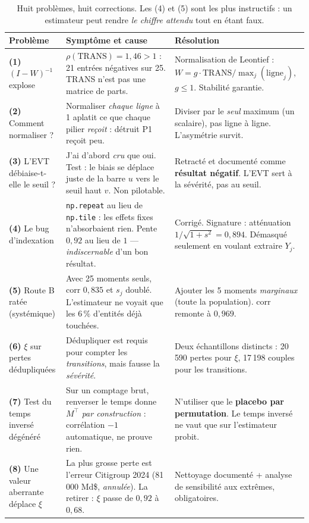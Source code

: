 \documentclass[11pt,a4paper]{article}
\newcommand{\Y}{Y}
\begin{document}
\begin{table}[htbp]\centering\small
\renewcommand{\arraystretch}{1.35}
\begin{tabularx}{\textwidth}{@{}>{\raggedright\arraybackslash}p{3.5cm} >{\raggedright\arraybackslash}X >{\raggedright\arraybackslash}p{4.4cm}@{}}
\toprule
\textbf{Problème} & \textbf{Symptôme et cause} & \textbf{Résolution} \\
\midrule
\textbf{(1)} $(I-W)^{-1}$ explose &
$\rho(\mathrm{TRANS})=1{,}46>1$ : 21 entrées négatives sur 25. TRANS n'est pas une matrice de
parts. &
Normalisation de Leontief : $W=g\cdot\mathrm{TRANS}/\max_j(\text{ligne}_j)$, $g\le 1$. Stabilité
garantie. \\
\addlinespace[2pt]
\textbf{(2)} Comment normaliser ? &
Normaliser \emph{chaque ligne} à 1 aplatit ce que chaque pilier \emph{reçoit} : détruit
\og{}P1 reçoit peu\fg{}. &
Diviser par le \emph{seul} maximum (un scalaire), pas ligne à ligne. L'asymétrie survit. \\
\addlinespace[2pt]
\textbf{(3)} L'EVT débiaise-t-elle le seuil ? &
J'ai d'abord \emph{cru} que oui. Test : le biais se déplace juste de la barre $u$ vers le seuil
haut $v$. Non pilotable. &
Retracté et documenté comme \textbf{résultat négatif}. L'EVT sert à la sévérité, pas au seuil. \\
\addlinespace[2pt]
\textbf{(4)} Le bug d'indexation &
\texttt{np.repeat} au lieu de \texttt{np.tile} : les effets fixes n'absorbaient rien. Pente
$0{,}92$ au lieu de $1$ --- \emph{indiscernable} d'un bon résultat. &
Corrigé. Signature : atténuation $1/\sqrt{1+s^2}=0{,}894$. Démasqué seulement en voulant
extraire $\Y_j$. \\
\addlinespace[2pt]
\textbf{(5)} Route B ratée (systémique) &
Avec 25 moments seuls, corr $0{,}835$ et $s_j$ doublé. L'estimateur ne voyait que les $6\,\%$
d'entités déjà touchées. &
Ajouter les 5 moments \emph{marginaux} (toute la population). corr remonte à $0{,}969$. \\
\addlinespace[2pt]
\textbf{(6)} $\xi$ sur pertes dédupliquées &
Dédupliquer est requis pour compter les \emph{transitions}, mais fausse la \emph{sévérité}. &
Deux échantillons distincts : 20\,590 pertes pour $\xi$, 17\,198 couples pour les transitions. \\
\addlinespace[2pt]
\textbf{(7)} Test du temps inversé dégénéré &
Sur un comptage brut, renverser le temps donne $M^\top$ \emph{par construction} : corrélation
$-1$ automatique, ne prouve rien. &
N'utiliser que le \textbf{placebo par permutation}. Le temps inversé ne vaut que sur
l'estimateur probit. \\
\addlinespace[2pt]
\textbf{(8)} Une valeur aberrante déplace $\xi$ &
La plus grosse perte est l'erreur Citigroup 2024 (81\,000 Md\$, \emph{annulée}). La retirer :
$\xi$ passe de $0{,}92$ à $0{,}68$. &
Nettoyage documenté + analyse de sensibilité aux extrêmes, obligatoires. \\
\bottomrule
\end{tabularx}
\caption{Huit problèmes, huit corrections. Les (4) et (5) sont les plus instructifs : un
estimateur peut rendre \emph{le chiffre attendu} tout en étant faux.}
\end{table}
\end{document}
